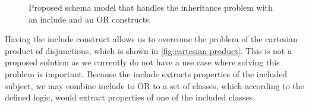 \begin{figure}[h!]\centering
  \centering

    \caption{Proposed schema model that handles the inheritance problem with an include and an OR constructs.}
    \label{fig:cartesian-product:include}
  \end{figure}

\bigskip

Having the include construct allows us to overcome the problem of the cartesian product of disjunctions, which is shown in \autoref{fig:cartesian-product}. This is not a proposed solution as we currently do not have a use case where solving this problem is important. Because the include extracts properties of the included subject, we may combine include to OR to a set of classes, which according to the defined logic, would extract properties of one of the included classes.

